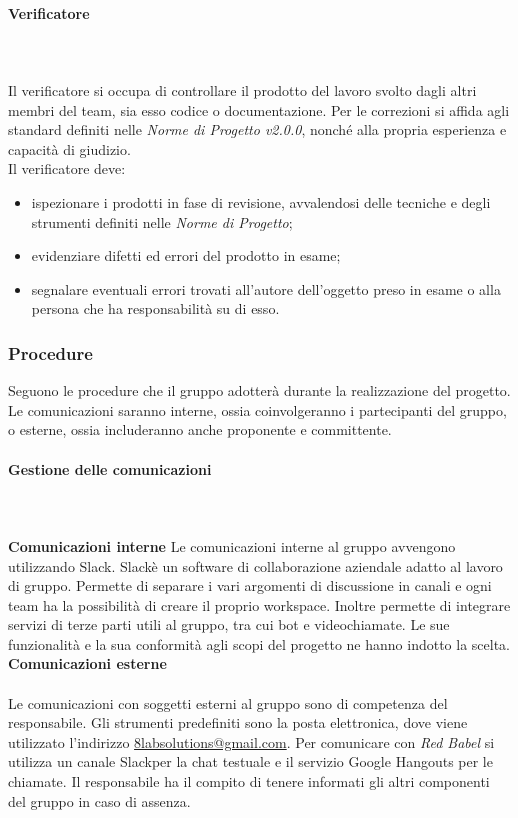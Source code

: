 			\paragraph{Verificatore} \mbox{}\\ \mbox{}\\
			Il verificatore si occupa di controllare il prodotto del lavoro svolto dagli altri membri del team, sia esso codice o documentazione. Per le correzioni si affida agli standard definiti nelle \textit{Norme di Progetto v2.0.0}, nonché alla propria esperienza e capacità di giudizio.\\
			Il verificatore deve:
			\begin{itemize}
				\item ispezionare i prodotti in fase di revisione, avvalendosi delle tecniche e degli strumenti definiti nelle \textit{Norme di Progetto};
				\item evidenziare difetti ed errori del prodotto in esame;
				\item segnalare eventuali errori trovati all'autore dell'oggetto preso in esame o alla persona che ha responsabilità su di esso.
			\end{itemize}
		\subsubsection{Procedure}

		Seguono le procedure che il gruppo adotterà durante la realizzazione del progetto. Le comunicazioni saranno interne, ossia coinvolgeranno i partecipanti del gruppo, o esterne, ossia includeranno anche proponente e committente.
			\paragraph{Gestione delle comunicazioni} \mbox{}\\ \mbox{}\\
			\textbf{Comunicazioni interne} \newline \newline
			Le comunicazioni interne al gruppo avvengono utilizzando Slack\glo. Slack\glosp è un software di collaborazione aziendale adatto al lavoro di gruppo. Permette di separare i vari argomenti di discussione in canali e ogni team ha la possibilità di creare il proprio workspace. Inoltre permette di integrare servizi di terze parti utili al gruppo, tra cui bot e videochiamate. Le sue funzionalità e la sua conformità agli scopi del progetto ne hanno indotto la scelta. \newline \newline
			\textbf{Comunicazioni esterne} \mbox{}\\ \mbox{}\\
			Le comunicazioni con soggetti esterni al gruppo sono di competenza del responsabile. Gli strumenti predefiniti sono la posta elettronica, dove viene utilizzato l'indirizzo \href{mailto:8labsolutions@gmail.com}{8labsolutions@gmail.com}.
			Per comunicare con \textit{Red Babel} si utilizza un canale Slack\glosp per la chat testuale e il servizio Google Hangouts per le chiamate. Il responsabile ha il compito di tenere informati gli altri componenti del gruppo in caso di assenza.
			\newline
